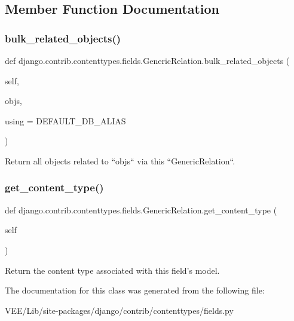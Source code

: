 \subsection{Member Function Documentation}
\mbox{\label{classdjango_1_1contrib_1_1contenttypes_1_1fields_1_1_generic_relation_a90c1e1dff24c340309efe119c442631e}} 
\subsubsection{\texorpdfstring{bulk\+\_\+related\+\_\+objects()}{bulk\_related\_objects()}}
{\footnotesize\ttfamily def django.\+contrib.\+contenttypes.\+fields.\+Generic\+Relation.\+bulk\+\_\+related\+\_\+objects (\begin{DoxyParamCaption}\item[{}]{self,  }\item[{}]{objs,  }\item[{}]{using = {\ttfamily DEFAULT\+\_\+DB\+\_\+ALIAS} }\end{DoxyParamCaption})}

\begin{DoxyVerb}Return all objects related to ``objs`` via this ``GenericRelation``.
\end{DoxyVerb}
 \mbox{\label{classdjango_1_1contrib_1_1contenttypes_1_1fields_1_1_generic_relation_a276f967389fb312408beb15ddd5d45ac}} 
\subsubsection{\texorpdfstring{get\+\_\+content\+\_\+type()}{get\_content\_type()}}
{\footnotesize\ttfamily def django.\+contrib.\+contenttypes.\+fields.\+Generic\+Relation.\+get\+\_\+content\+\_\+type (\begin{DoxyParamCaption}\item[{}]{self }\end{DoxyParamCaption})}

\begin{DoxyVerb}Return the content type associated with this field's model.
\end{DoxyVerb}
 

The documentation for this class was generated from the following file\+:\begin{DoxyCompactItemize}
\item 
V\+E\+E/\+Lib/site-\/packages/django/contrib/contenttypes/fields.\+py\end{DoxyCompactItemize}
